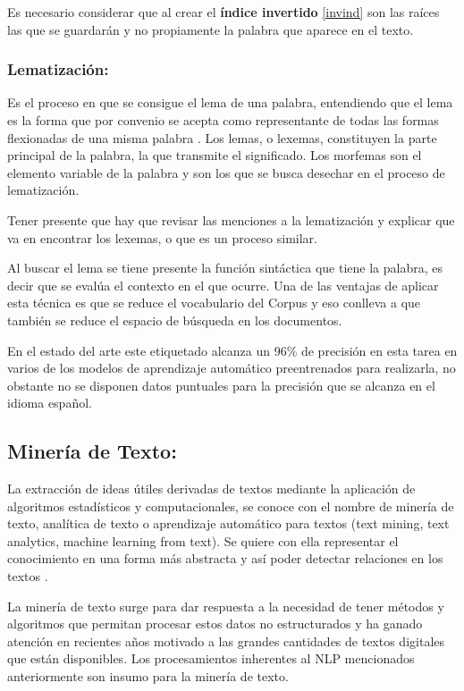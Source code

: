 \documentclass[
  10,
  openany]{book}
\begin{document}
Es necesario considerar que al crear el \textbf{índice invertido} \ref{invind} son las raíces las que se guardarán y no propiamente la palabra que aparece en el texto.

\hypertarget{lemma}{%
\subsubsection{Lematización:}\label{lemma}}

Es el proceso en que se consigue el lema de una palabra, entendiendo que el lema es la forma que por convenio se acepta como representante de todas las formas flexionadas de una misma palabra \citep{demarneffe2021}. Los lemas, o lexemas, constituyen la parte principal de la palabra, la que transmite el significado. Los morfemas son el elemento variable de la palabra y son los que se busca desechar en el proceso de lematización.

Tener presente que hay que revisar las menciones a la lematización y explicar que va en encontrar los lexemas, o que es un proceso similar.

Al buscar el lema se tiene presente la función sintáctica que tiene la palabra, es decir que se evalúa el contexto en el que ocurre. Una de las ventajas de aplicar esta técnica es que se reduce el vocabulario del Corpus y eso conlleva a que también se reduce el espacio de búsqueda en los documentos.

En el estado del arte este etiquetado alcanza un 96\% de precisión en esta tarea en varios de los modelos de aprendizaje automático preentrenados para realizarla, no obstante no se disponen datos puntuales para la precisión que se alcanza en el idioma español.

\hypertarget{textmin}{%
\subsection{Minería de Texto:}\label{textmin}}

La extracción de ideas útiles derivadas de textos mediante la aplicación de algoritmos estadísticos y computacionales, se conoce con el nombre de minería de texto, analítica de texto o aprendizaje automático para textos (text mining, text analytics, machine learning from text). Se quiere con ella representar el conocimiento en una forma más abstracta y así poder detectar relaciones en los textos \citep{aggarwal2018a}.

La minería de texto surge para dar respuesta a la necesidad de tener métodos y algoritmos que permitan procesar estos datos no estructurados \citep{miningt2012} y ha ganado atención en recientes años motivado a las grandes cantidades de textos digitales que están disponibles. Los procesamientos inherentes al NLP mencionados anteriormente son insumo para la minería de texto.
\end{document}
